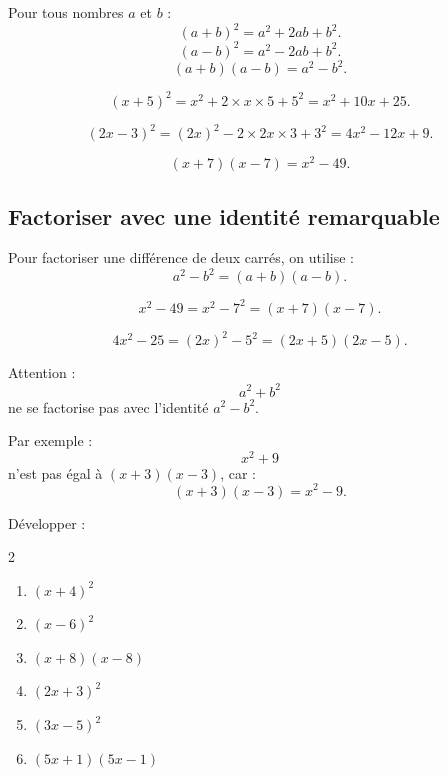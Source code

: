 \documentclass[11pt,a4paper]{article}
\newcounter{exercice}
\begin{document}
\begin{propriete}
Pour tous nombres $a$ et $b$ :
\[
(a+b)^2=a^2+2ab+b^2.
\]
\[
(a-b)^2=a^2-2ab+b^2.
\]
\[
(a+b)(a-b)=a^2-b^2.
\]
\end{propriete}

\begin{exemple}
\[
(x+5)^2=x^2+2\times x\times5+5^2=x^2+10x+25.
\]
\end{exemple}

\begin{exemple}
\[
(2x-3)^2=(2x)^2-2\times2x\times3+3^2=4x^2-12x+9.
\]
\end{exemple}

\begin{exemple}
\[
(x+7)(x-7)=x^2-49.
\]
\end{exemple}

\subsection{Factoriser avec une identité remarquable}

\begin{methode}
Pour factoriser une différence de deux carrés, on utilise :
\[
a^2-b^2=(a+b)(a-b).
\]
\end{methode}

\begin{exemple}
\[
x^2-49=x^2-7^2=(x+7)(x-7).
\]
\end{exemple}

\begin{exemple}
\[
4x^2-25=(2x)^2-5^2=(2x+5)(2x-5).
\]
\end{exemple}

\begin{attention}
Attention :
\[
a^2+b^2
\]
ne se factorise pas avec l'identité $a^2-b^2$.

Par exemple :
\[
x^2+9
\]
n'est pas égal à $(x+3)(x-3)$, car :
\[
(x+3)(x-3)=x^2-9.
\]
\end{attention}

\begin{exercice}
Développer :
\begin{multicols}{2}
\begin{enumerate}[label=\alph*)]
  \item $(x+4)^2$
  \item $(x-6)^2$
  \item $(x+8)(x-8)$
  \item $(2x+3)^2$
  \item $(3x-5)^2$
  \item $(5x+1)(5x-1)$
\end{enumerate}
\end{multicols}
\end{exercice}
\end{document}

